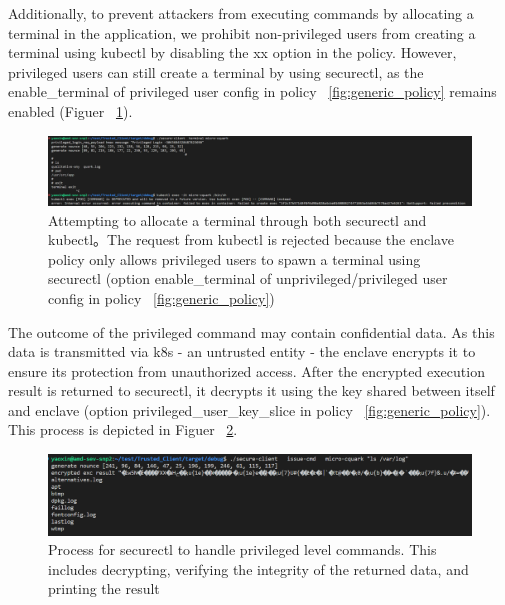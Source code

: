 Additionally, to prevent attackers from executing commands by allocating a terminal in the application, we prohibit non-privileged users from creating a terminal using kubectl by disabling the xx option in the policy. However, privileged users can still create a terminal by using securectl, 
as the enable\_terminal of privileged user config in policy ~\ref{fig:generic_policy} remains enabled (Figuer ~\ref{fig:cquark_terminal}).

\begin{figure}[H]
    \centering
    \includegraphics[width=1\textwidth]{images/cquark_terminal.png}
    \caption[Attempting to allocate a terminal through both securectl and kubectl]{Attempting to allocate a terminal through both securectl and kubectl。The request from kubectl is rejected because the enclave policy only allows privileged users to spawn a terminal using securectl 
    (option enable\_terminal of unprivileged/privileged user config in policy ~\ref{fig:generic_policy})}
    \label{fig:cquark_terminal}
\end{figure}

The outcome of the privileged command may contain confidential data. As this data is transmitted via k8s - an untrusted entity - the enclave encrypts it to ensure its protection from unauthorized access. After the encrypted execution result is returned to securectl, it decrypts it 
using the key shared between itself and enclave (option privileged\_user\_key\_slice in policy ~\ref{fig:generic_policy}). This process is depicted in Figuer ~\ref{fig:cquark_priviled_cmd_result_protection}.

\begin{figure}[H]
    \centering
    \includegraphics[width=1\textwidth]{images/cquark_priviled_cmd_result_protection.png}
    \caption[Process for securectl to handle privileged level commands]{Process for securectl to handle privileged level commands. This includes decrypting, verifying the integrity of the returned data, and printing the result}
    \label{fig:cquark_priviled_cmd_result_protection}
\end{figure}

